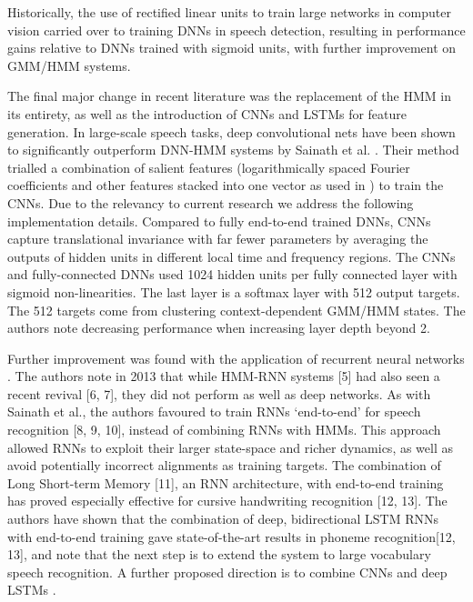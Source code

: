 \documentclass[12pt]{llncs}
\newcommand{\ikn}[1]{\todo[size = \small, color=orange!30]{[ik] #1}}
\begin{document}


Historically, the use of rectified linear units to train large networks in computer vision carried over to training DNNs in speech detection, resulting in performance gains relative to DNNs trained with sigmoid units, with further improvement on GMM/HMM systems. \cite{dahl2013improving}




The final major change in recent literature was the replacement of the HMM in its entirety, as well as the introduction of CNNs and LSTMs for feature generation.
In large-scale speech tasks, deep convolutional nets have been shown to significantly outperform DNN-HMM systems by Sainath et al. \cite{sainath2015deep}. Their method trialled a combination of salient features (logarithmically spaced Fourier coefficients and other features stacked into one vector as used in \cite{soltau2010ibm}) to train the CNNs. Due to the relevancy to current research \ikn{Re-word} we address the following implementation details. Compared to fully end-to-end trained DNNs\ikn{Check claim}, CNNs capture translational invariance with far fewer parameters by averaging the outputs of hidden units in different local time and frequency regions. The CNNs and fully-connected DNNs used 1024 hidden units per fully connected layer with sigmoid non-linearities. The last layer is a softmax layer with 512 output targets. The 512 targets come from clustering context-dependent GMM/HMM states. The authors note decreasing performance when increasing layer depth beyond 2.
	
 


Further improvement was found with the application of recurrent neural networks \cite{graves2013speech}. The authors note in 2013 that while HMM-RNN systems [5] had also seen a recent revival [6, 7], they did not perform as well as deep networks. As with Sainath et al., the authors favoured to train RNNs ‘end-to-end’ for speech recognition [8, 9, 10], instead of combining RNNs with HMMs. This approach allowed RNNs to exploit their larger state-space and richer dynamics, as well as avoid potentially incorrect alignments as training targets. The combination of Long Short-term Memory [11], an RNN architecture, with end-to-end training has proved especially effective for cursive handwriting recognition [12, 13]. The authors have shown that the combination of deep, bidirectional LSTM RNNs with end-to-end training gave state-of-the-art results in phoneme recognition[12, 13]\ikn{Check refs}, and note that the next step is to extend the system to large vocabulary speech recognition. A further proposed direction is to combine CNNs and deep LSTMs \cite{graves2013speech}.
\end{document}
